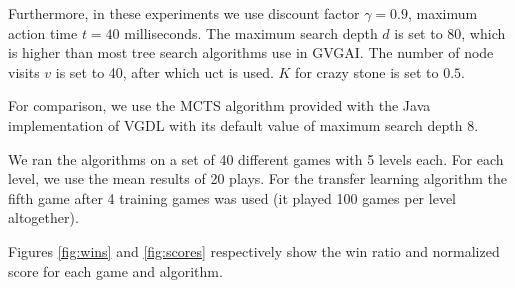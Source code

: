 Furthermore, in these experiments we use discount factor $\gamma = 0.9$,
maximum action time $t = 40$ milliseconds. The maximum search depth $d$
is set to 80, which is higher than most tree search algorithms use in GVGAI. The
number of node visits $v$ is set to 40, after which \textsf{uct} is used. $K$
for crazy stone is set to $0.5$.

For comparison, we use the MCTS algorithm provided with the Java implementation
of VGDL with its default value of maximum search depth 8. 

We ran the algorithms on a set of 40 different games with 5 levels each. For
each level, we use the mean results of 20 plays. For the transfer learning
algorithm the fifth game after 4 training games was used (it played 100
games per level altogether).

Figures \ref{fig:wins} and \ref{fig:scores} respectively show the win ratio and
normalized score for each game and algorithm.
